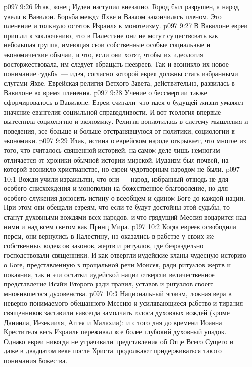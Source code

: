 \vs p097 9:26 Итак, конец Иудеи наступил внезапно. Город был разрушен, а народ увели в Вавилон. Борьба между Яхве и Ваалом закончилась пленом. Это пленение и толкнуло остаток Израиля к монотеизму.
\vs p097 9:27 \pc В Вавилоне евреи пришли к заключению, что в Палестине они не могут существовать как небольшая группа, имеющая свои собственные особые социальные и экономические обычаи, и что, если они хотят, чтобы их идеология восторжествовала, им следует обращать неевреев. Так и возникло их новое понимание судьбы --- идея, согласно которой евреи должны стать избранными слугами Яхве. Еврейская религия Ветхого Завета, действительно, развилась в Вавилоне во время пленения.
\vs p097 9:28 Учение о бессмертии также сформировалось в Вавилоне. Евреи считали, что идея о будущей жизни умаляет значение евангелия социальной справедливости. И вот теология впервые вытеснила социологию и экономику. Религия воплотилась в систему мышления и поведения, все больше и больше отстранявшуюся от политики, социологии и экономики.
\vs p097 9:29 \pc Итак, истина о еврейском народе открывает, что многое из того, что считалось священной историей, на самом деле лишь немногим отличается от хроники обычной истории мирской. Иудаизм был почвой, на которой возникло христианство, но евреи чудотворным народом не были.
\vs p097 10:1 Вожди учили израильтян, что они --- народ, избранный отнюдь не для особого снисхождения и монополии на божественное благоволение, но для особого служения доносить истину о всеобщем и едином Боге до каждой нации. При этом они обещали евреям, что если те будут достойны этой судьбы, то станут духовными вождями всех народов, и что грядущий Мессия воцарится над ними и над всем светом как Принц Мира.
\vs p097 10:2 Когда евреев освободили персы, они вернулись в Палестину, но оказались в рабстве у своих же собственных кодексов законов, жертв и ритуалов, где безраздельно господствовали священники. И как отвергли иудейские кланы чудесную историю о Боге, представленную в прощальной речи Моисея, ради ритуалов жертв и покаяния, так и эти остатки иудейской нации отвергли величественное представление Исайи Второго ради правил, уставов и ритуалов своего множившегося духовенства.
\vs p097 10:3 Национальный эгоизм, ложная вера в неверно понимаемого обещанного Мессию и усиливающиеся рабство и тирания священников заставили навсегда замолчать голоса духовных вождей (кроме Даниила, Иезекииля, Аггея и Малахии); и с того дня до времени Иоанна Крестителя весь Израиль переживал все более глубокий духовный упадок. Однако евреи никогда не утрачивали представления об Отце Всего Сущего и даже в двадцатом веке после Христа продолжают придерживаться такого понимания Божества.
